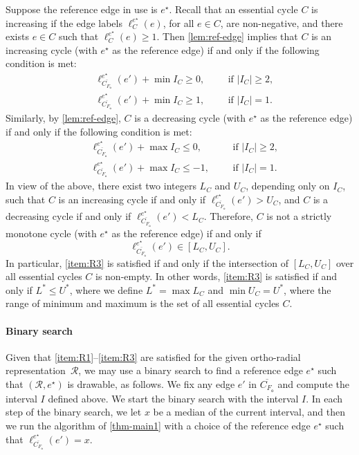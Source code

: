\documentclass{article}\usepackage[a4paper,margin=20mm]{geometry}
\newcommand{\RR}{\mathcal{R}}
\newcommand{\FO}{F_\mathsf{o}}
\newcommand{\eref}{e^\star}
\begin{document}
Suppose the reference edge in use is $\eref$. Recall that an essential cycle $C$ is increasing if the edge labels $\ell_C^{\eref}(e)$, for all $e \in C$, are non-negative, and there exists $e \in C$ such that $\ell_C^{\eref}(e) \geq 1$.
Then \cref{lem:ref-edge} implies that $C$ is an increasing cycle (with $\eref$ as the reference edge) if and only if the following condition is met:
\begin{align*}
    &\ell_{\overline{C_{\FO}}}^{\eref}(e') + \min I_C \geq 0, && & \text{if $|I_C| \geq 2$,}\\
    &\ell_{\overline{C_{\FO}}}^{\eref}(e') + \min I_C \geq 1, && & \text{if $|I_C| = 1$.}
\end{align*}
Similarly, by \cref{lem:ref-edge}, $C$ is a decreasing cycle  (with $\eref$ as the reference edge) if and only if the following condition is met:
\begin{align*}
    &\ell_{\overline{C_{\FO}}}^{\eref}(e') + \max I_C \leq 0, && & \text{if $|I_C| \geq 2$,}\\
    &\ell_{\overline{C_{\FO}}}^{\eref}(e') + \max I_C \leq -1, && & \text{if $|I_C| = 1$.}
\end{align*}
In view of the above, there exist two integers $L_C$ and $U_C$, depending only on $I_C$, such that $C$ is an increasing cycle if and only if 
$\ell_{\overline{C_{\FO}}}^{\eref}(e') > U_C$,  and  $C$ is a decreasing cycle if and only if $\ell_{\overline{C_{\FO}}}^{\eref}(e') < L_C$. Therefore, $C$ is not a strictly monotone cycle (with $\eref$ as the reference edge) if and only if \[\ell_{\overline{C_{\FO}}}^{\eref}(e') \in [L_C, U_C].\] In particular, \ref{item:R3} is satisfied if and only if the intersection of $[L_C, U_C]$ over all essential cycles $C$ is non-empty. In other words,  \ref{item:R3} is satisfied if and only if $L^\ast  \leq U^\ast$, where we define $L^\ast = \max L_C$ and $\min U_C = U^\ast$, where the range of minimum and maximum is the set of all essential cycles $C$.

\paragraph{Binary search}
Given that \ref{item:R1}--\ref{item:R3} are satisfied for the given ortho-radial representation~$\RR$, we may use a binary search to find a reference edge $\eref$ such that  $(\RR, \eref)$ is drawable, as follows. We fix any edge $e'$ in $\overline{C_{\FO}}$ and compute the interval $I$ defined above. We start the binary search with the interval $I$.
In each step of the binary search, we let $x$ be a median of the current interval, and then we run the algorithm of \cref{thm-main1} with a choice of the reference edge $\eref$ such that $\ell_{\overline{C_{\FO}}}^{\eref}(e') = x$.
\end{document}
